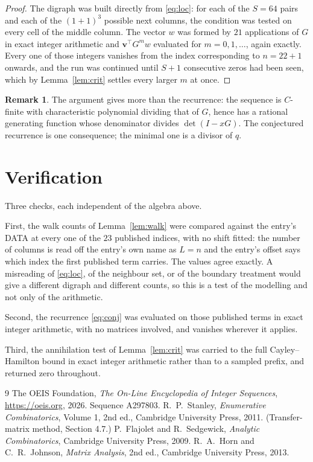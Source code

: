 \documentclass[11pt,a4paper]{article}
\theoremstyle{plain}
\theoremstyle{definition}
\newtheorem{remark}[theorem]{Remark}
\begin{document}
\begin{proof}
The digraph was built directly from \eqref{eq:loc}: for each of the $S=64$ pairs and each
of the $(1+1)^{3}$ possible next columns, the condition was tested on every cell of
the middle column. The vector $w$ was formed by $21$ applications of $G$ in exact integer
arithmetic and $\mathbf{v}^{\!\top}G^{m}w$ evaluated for $m=0,1,\dots$, again exactly.
Every one of those integers vanishes from the index corresponding to $n=22+1$ onwards,
and the run was continued until $S+1$ consecutive zeros had been seen, which by
Lemma~\ref{lem:crit} settles every larger $m$ at once.
\end{proof}

\begin{remark}
The argument gives more than the recurrence: the sequence is $C$-finite with characteristic
polynomial dividing that of $G$, hence has a rational generating function whose denominator
divides $\det(I-xG)$. The conjectured recurrence is one consequence; the minimal one is a
divisor of $q$.
\end{remark}

\section{Verification}

Three checks, each independent of the algebra above.

First, the walk counts of Lemma~\ref{lem:walk} were compared against the entry's DATA at
every one of the $23$ published indices, with no shift fitted: the number of columns is
read off the entry's own name as $L=n$ and the entry's offset says which index the first
published term carries. The values agree exactly. A misreading of \eqref{eq:loc}, of the
neighbour set, or of the boundary treatment would give a different digraph and different
counts, so this is a test of the modelling and not only of the arithmetic.

Second, the recurrence \eqref{eq:conj} was evaluated on those published terms in exact
integer arithmetic, with no matrices involved, and vanishes wherever it applies.

Third, the annihilation test of Lemma~\ref{lem:crit} was carried to the full
Cayley--Hamilton bound in exact integer arithmetic rather than to a sampled prefix, and
returned zero throughout.

\begin{thebibliography}{9}
 The OEIS Foundation, \emph{The On-Line Encyclopedia of Integer
Sequences}, \url{https://oeis.org}, 2026. Sequence A297803.
 R.~P.~Stanley, \emph{Enumerative Combinatorics}, Volume 1, 2nd ed.,
Cambridge University Press, 2011. (Transfer-matrix method, Section 4.7.)
 P.~Flajolet and R.~Sedgewick, \emph{Analytic Combinatorics}, Cambridge
University Press, 2009.
 R.~A.~Horn and C.~R.~Johnson, \emph{Matrix Analysis}, 2nd ed., Cambridge
University Press, 2013.
\end{thebibliography}
\end{document}

